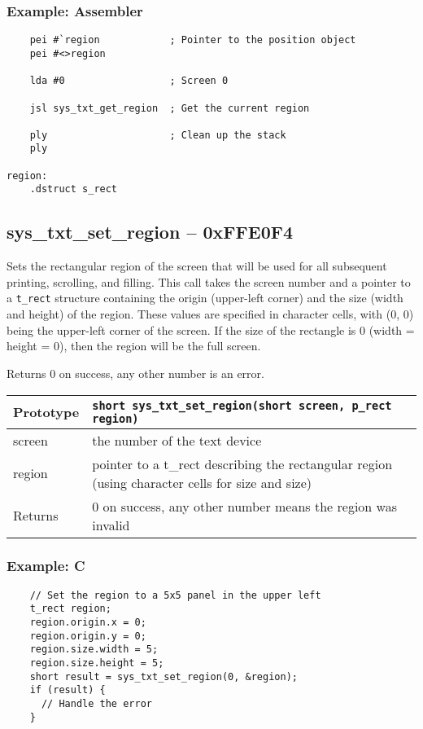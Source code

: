 \subsubsection*{Example: Assembler}
\begin{verbatim}
    pei #`region            ; Pointer to the position object
    pei #<>region

    lda #0                  ; Screen 0

    jsl sys_txt_get_region  ; Get the current region

    ply                     ; Clean up the stack
    ply

region:
    .dstruct s_rect
\end{verbatim}


\subsection*{sys\_txt\_set\_region -- 0xFFE0F4}
Sets the rectangular region of the screen that will be used for all subsequent printing, scrolling, and filling. This call takes the screen number and a pointer to a \verb+t_rect+ structure containing the origin (upper-left corner) and the size (width and height) of the region. These values are specified in character cells, with (0, 0) being the upper-left corner of the screen. If the size of the rectangle is 0 (width = height = 0), then the region will be the full screen.

Returns 0 on success, any other number is an error.

\bigskip

\begin{tabular}{|l||l|} \hline
Prototype & \lstinline!short sys_txt_set_region(short screen, p_rect region)! \\ \hline
screen & the number of the text device \\ \hline
region & pointer to a t\_rect describing the rectangular region (using character cells for size and size) \\ \hline
Returns & 0 on success, any other number means the region was invalid \\ \hline
\end{tabular}

\subsubsection*{Example: C}
\begin{lstlisting}
    // Set the region to a 5x5 panel in the upper left
    t_rect region;
    region.origin.x = 0;
    region.origin.y = 0;
    region.size.width = 5;
    region.size.height = 5;
    short result = sys_txt_set_region(0, &region);
    if (result) {
      // Handle the error
    }
\end{lstlisting}

